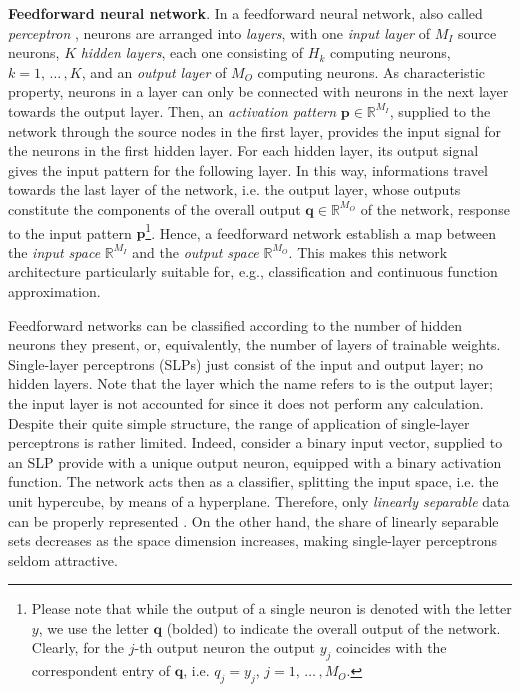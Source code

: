 \documentclass[11pt, a4paper]{report}
\numberwithin{equation}{chapter}
\theoremstyle{theorem}
\theoremstyle{definition}
\numberwithin{figure}{section}
\begin{document}
		\vspace*{0.3cm}
		
		\noindent \textbf{Feedforward neural network}. In a feedforward neural network, also called \emph{perceptron} \cite{Ros58}, neurons are arranged into \emph{layers}, with one \emph{input layer} of $M_I$ source neurons, $K$ \emph{hidden layers}, each one consisting of $H_k$ computing neurons, $k = 1, \, \ldots \, , K$, and an \emph{output layer} of $M_O$ computing neurons. As characteristic property, neurons in a layer can only be connected with neurons in the next layer towards the output layer. Then, an \emph{activation pattern} $\boldsymbol{p} \in \mathbb{R}^{M_I}$, supplied to the network through the source nodes in the first layer, provides the input signal for the neurons in the first hidden layer. For each hidden layer, its output signal gives the input pattern for the following layer. In this way, informations travel towards the last layer of the network, i.e. the output layer, whose outputs constitute the components of the overall output $\boldsymbol{q} \in \mathbb{R}^{M_O}$ of the network, response to the input pattern $\boldsymbol{p}$\footnote{Please note that while the output of a single neuron is denoted with the letter $y$, we use the letter $\boldsymbol{q}$ (bolded) to indicate the overall output of the network. Clearly, for the $j$-th output neuron the output $y_j$ coincides with the correspondent entry of $\boldsymbol{q}$, i.e. $q_j = y_j$, $j = 1, \, \ldots \, , M_O$.}. Hence, a feedforward network establish a map between the \emph{input space} $\mathbb{R}^{M_I}$ and the \emph{output space} $\mathbb{R}^{M_O}$. This makes this network architecture particularly suitable for, e.g., classification and continuous function approximation.
		
		Feedforward networks can be classified according to the number of hidden neurons they present, or, equivalently, the number of layers of trainable weights. Single-layer perceptrons (SLPs) just consist of the input and output layer; no hidden layers. Note that the layer which the name refers to is the output layer; the input layer is not accounted for since it does not perform any calculation. Despite their quite simple structure, the range of application of single-layer perceptrons is rather limited. Indeed, consider a binary input vector, supplied to an SLP provide with a unique output neuron, equipped with a binary activation function. The network acts then as a classifier, splitting the input space, i.e. the unit hypercube, by means of a hyperplane. Therefore, only \emph{linearly separable} data can be properly represented \cite{Kri}. On the other hand, the share of linearly separable sets decreases as the space dimension increases, making single-layer perceptrons seldom attractive.
		
\end{document}
